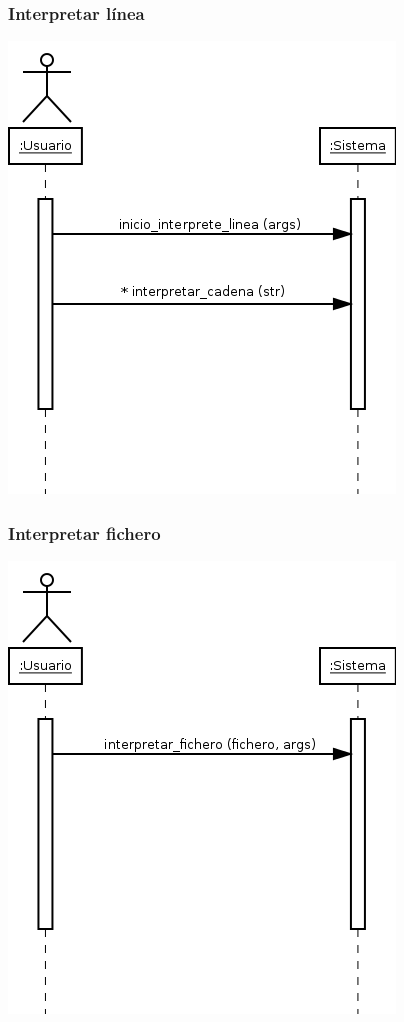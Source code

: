 \subsubsection{Interpretar línea}
\begin{center}
\includegraphics[scale=0.4]{interpretar_line.png} \\
\end{center}

\subsubsection{Interpretar fichero}
\begin{center}
\includegraphics[scale=0.4]{interpretar_file.png} \\
\end{center}

